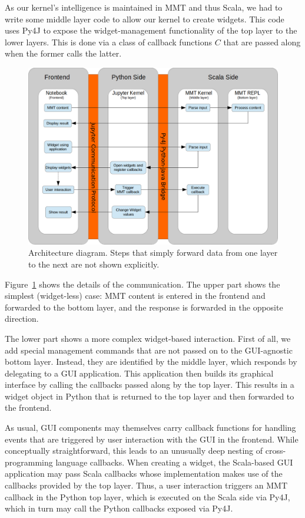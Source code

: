 As our kernel's intelligence is maintained in MMT and thus Scala, we had to write some middle layer code to allow our kernel to create widgets.
This code uses Py4J to expose the widget-management functionality of the top layer to the lower layers.
This is done via a class of callback functions $C$ that are passed along when the former calls the latter.

\begin{figure}[ht]\centering
  \includegraphics[width=12cm]{figures/ArchitectureDiagram}
  \caption{
    Architecture diagram.
    Steps that simply forward data from one layer to the next are not shown explicitly. 
  }\label{fig:architecture-diagram}
\end{figure}


Figure~\ref{fig:architecture-diagram} shows the details of the communication.
The upper part shows the simplest (widget-less) case: MMT content is entered in the frontend and forwarded to the bottom layer, and the response is forwarded in the opposite direction. 

The lower part shows a more complex widget-based interaction.
First of all, we add special management commands that are not passed on to the GUI-agnostic bottom layer.
Instead, they are identified by the middle layer, which responds by delegating to a GUI application.
This application then builds its graphical interface by calling the callbacks passed along by the top layer.
This results in a widget object in Python that is returned to the top layer and then forwarded to the frontend.

As usual, GUI components may themselves carry callback functions for handling events that are triggered by user interaction with the GUI in the frontend.
While conceptually straightforward, this leads to an unusually deep nesting of cross-programming language callbacks.
When creating a widget, the Scala-based GUI application may pass Scala callbacks whose implementation makes use of the callbacks provided by the top layer.
Thus, a user interaction triggers an MMT callback in the Python top layer, which is executed on the Scala side via Py4J, which in turn may call the Python callbacks exposed via Py4J.

